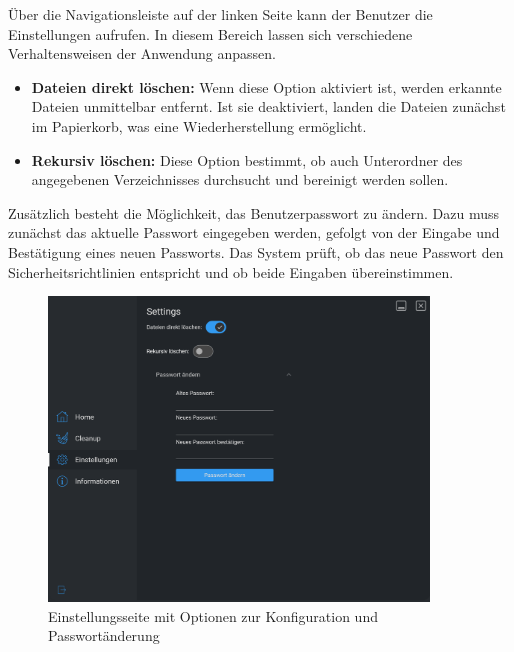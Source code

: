 
Über die Navigationsleiste auf der linken Seite kann der Benutzer die Einstellungen aufrufen. In diesem Bereich lassen sich verschiedene Verhaltensweisen der Anwendung anpassen.

\begin{itemize}
    \item \textbf{Dateien direkt löschen:} Wenn diese Option aktiviert ist, werden erkannte Dateien unmittelbar entfernt. Ist sie deaktiviert, landen die Dateien zunächst im Papierkorb, was eine Wiederherstellung ermöglicht.
    \item \textbf{Rekursiv löschen:} Diese Option bestimmt, ob auch Unterordner des angegebenen Verzeichnisses durchsucht und bereinigt werden sollen.
\end{itemize}

Zusätzlich besteht die Möglichkeit, das Benutzerpasswort zu ändern. Dazu muss zunächst das aktuelle Passwort eingegeben werden, gefolgt von der Eingabe und Bestätigung eines neuen Passworts. Das System prüft, ob das neue Passwort den Sicherheitsrichtlinien entspricht und ob beide Eingaben übereinstimmen.

\begin{figure}[H]
    \centering
    \includegraphics[width=0.9\textwidth]{src/screenshot_settings.png}
    \caption{Einstellungsseite mit Optionen zur Konfiguration und Passwortänderung}
\end{figure}
